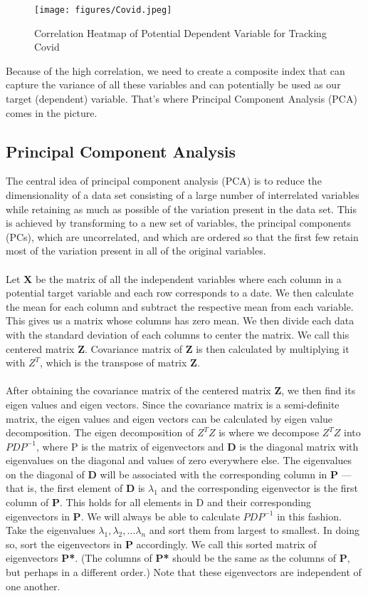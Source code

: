 \documentclass{article}
\begin{document}
\begin{figure}[H]
    \centering
    \texttt{[image: figures/Covid.jpeg]}%
    \caption{Correlation Heatmap of Potential Dependent Variable for Tracking Covid}
    \label{fig:covid}
\end{figure}

Because of the high correlation, we need to create a composite index that can capture the variance of all these variables and can potentially be used as our target (dependent) variable. That's where Principal Component Analysis (PCA) comes in the picture. \\

\subsection{Principal Component Analysis}
The central idea of principal component analysis (PCA) is to reduce the dimensionality of a data set consisting of a large number of interrelated variables while retaining as much as possible of the variation present in the data set. This is achieved by transforming to a new set of variables, the principal components (PCs), which are uncorrelated, and which are ordered so that the first few retain most of the variation present in all of the original variables. \\
\\
Let \textbf{X} be the matrix of all the independent variables where each column in a potential target variable and each row corresponds to a date. We then calculate the mean for each column and subtract the respective mean from each variable. This gives us a matrix whose columns has zero mean. We then divide each data with the standard deviation of each columns to center the matrix. We call this centered matrix \textbf{Z}. Covariance matrix of \textbf{Z} is then calculated by multiplying it with $Z^T$, which is the transpose of matrix \textbf{Z}. \\
\\
After obtaining the covariance matrix of the centered matrix \textbf{Z}, we then find its eigen values and eigen vectors. Since the covariance matrix is a semi-definite matrix, the eigen values and eigen vectors can be calculated by eigen value decomposition. The eigen decomposition of  $Z^T Z$ is where we decompose $Z^T Z$ into $PDP^{-1}$, where P is the matrix of eigenvectors and \textbf{D} is the diagonal matrix with eigenvalues on the diagonal and values of zero everywhere else. The eigenvalues on the diagonal of \textbf{D} will be associated with the corresponding column in \textbf{P} — that is, the first element of \textbf{D} is $\lambda_1$ and the corresponding eigenvector is the first column of \textbf{P}. This holds for all elements in D and their corresponding eigenvectors in \textbf{P}. We will always be able to calculate $PDP^{-1}$ in this fashion. Take the eigenvalues $\lambda_1, \lambda_2, \dotsc \lambda_n$ and sort them from largest to smallest. In doing so, sort the eigenvectors in \textbf{P} accordingly. We call this sorted matrix of eigenvectors \textbf{P*}. (The columns of \textbf{P*} should be the same as the columns of \textbf{P}, but perhaps in a different order.) Note that these eigenvectors are independent of one another.\\
\end{document}
